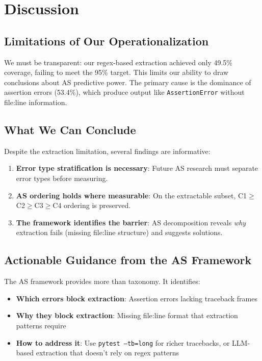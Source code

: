 \section{Discussion}

\subsection{Limitations of Our Operationalization}

We must be transparent: our regex-based extraction achieved only 49.5\% coverage, failing to meet the 95\% target. This limits our ability to draw conclusions about AS predictive power. The primary cause is the dominance of assertion errors (53.4\%), which produce output like \texttt{AssertionError} without file:line information.

\subsection{What We Can Conclude}

Despite the extraction limitation, several findings are informative:

\begin{enumerate}
    \item \textbf{Error type stratification is necessary}: Future AS research must separate error types before measuring.
    \item \textbf{AS ordering holds where measurable}: On the extractable subset, C1$\geq$C2$\geq$C3$\geq$C4 ordering is preserved.
    \item \textbf{The framework identifies the barrier}: AS decomposition reveals \emph{why} extraction fails (missing file:line structure) and suggests solutions.
\end{enumerate}

\subsection{Actionable Guidance from the AS Framework}

The AS framework provides more than taxonomy. It identifies:
\begin{itemize}
    \item \textbf{Which errors block extraction}: Assertion errors lacking traceback frames
    \item \textbf{Why they block extraction}: Missing file:line format that extraction patterns require
    \item \textbf{How to address it}: Use \texttt{pytest --tb=long} for richer tracebacks, or LLM-based extraction that doesn't rely on regex patterns
\end{itemize}

